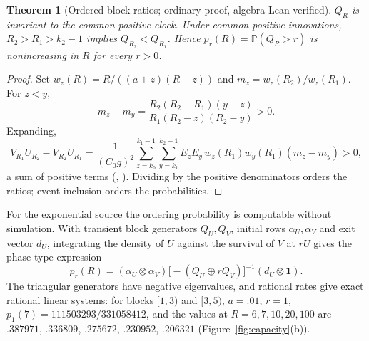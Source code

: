 \documentclass[11pt,a4paper]{article}
\theoremstyle{plain}
\newtheorem{theorem}{Theorem}[section]
\theoremstyle{definition}
\theoremstyle{remark}
\newcommand{\Prob}{\mathbb P}
\newcommand{\one}{\mathbf 1}
\begin{document}
\begin{theorem}[Ordered block ratios; ordinary proof, algebra Lean-verified]\label{thm:blocks}
$Q_R$ is invariant to the common positive clock. Under common positive innovations, $R_2>R_1>k_2-1$ implies $Q_{R_2}<Q_{R_1}$. Hence $p_r(R)=\Prob(Q_R>r)$ is nonincreasing in $R$ for every $r>0$.
\end{theorem}
\begin{proof}
Set $w_z(R)=R/((a+z)(R-z))$ and $m_z=w_z(R_2)/w_z(R_1)$. For $z<y$,
\[
m_z-m_y=\frac{R_2(R_2-R_1)(y-z)}{R_1(R_2-z)(R_2-y)}>0 .
\]
Expanding,
\[
V_{R_1}U_{R_2}-V_{R_2}U_{R_1}=\frac1{(C_0g)^2}\sum_{z=k_0}^{k_1-1}\sum_{y=k_1}^{k_2-1}E_zE_y\,w_z(R_1)w_y(R_1)(m_z-m_y)>0,
\]
a sum of positive terms (, ). Dividing by the positive denominators orders the ratios; event inclusion orders the probabilities.
\end{proof}
For the exponential source the ordering probability is computable without simulation. With transient block generators $Q_U,Q_V$, initial rows $\alpha_U,\alpha_V$ and exit vector $d_U$, integrating the density of $U$ against the survival of $V$ at $rU$ gives the phase-type expression \citep{neuts1981}
\begin{equation}\label{eq:kronecker}
p_r(R)=(\alpha_U\otimes\alpha_V)\bigl[-(Q_U\oplus rQ_V)\bigr]^{-1}(d_U\otimes\one).
\end{equation}
The triangular generators have negative eigenvalues, and rational rates give exact rational linear systems: for blocks $[1,3)$ and $[3,5)$, $a=.01$, $r=1$, $p_1(7)=111503293/331058412$, and the values at $R=6,7,10,20,100$ are $.387971$, $.336809$, $.275672$, $.230952$, $.206321$ (Figure~\ref{fig:capacity}(b)).
\end{document}
